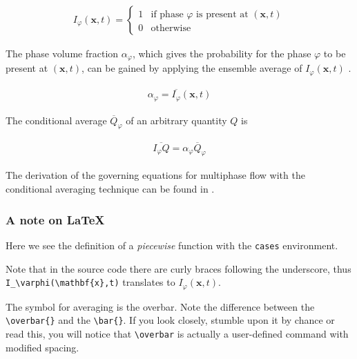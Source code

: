 \begin{gather}
	I_\varphi(\mathbf{x},t) = \begin{cases}
		1	& \text{if phase $\varphi$ is present at } (\mathbf{x},t) \\
		0	& \text{otherwise}
	\end{cases}
\end{gather}

The phase volume fraction $\alpha_\varphi$, which gives the probability for the phase $\varphi$ 
to be present at $(\mathbf{x},t)$, can be gained by applying the ensemble average of 
$I_\varphi(\mathbf{x},t)$ \cite{openCFD2005}.

\begin{gather}
	\alpha_\varphi = \overbar{I_\varphi}(\mathbf{x},t)
\end{gather}

The conditional average $\overbar{Q}_\varphi$ of an arbitrary quantity $Q$ is 

\begin{gather}
	\overbar{I_\varphi Q} = \alpha_\varphi \overbar{Q}_\varphi
\end{gather}

The derivation of the governing equations for multiphase flow with the conditional averaging 
technique can be found in \cite{marschallPhD,openCFD2005}.


%
%
%
%



\subsubsection*{A note on \LaTeX{}}

Here we see the definition of a \emph{piecewise} function with the \verb+cases+ environment.


Note that in the source code there are curly braces following the underscore, thus 
\verb+I_\varphi(\mathbf{x},t)+ translates to $I_\varphi(\mathbf{x},t)$.


The symbol for averaging is the overbar. Note the difference between the \verb+\overbar{}+ 
and the \verb+\bar{}+. If you look closely, stumble upon it by chance or read this, you will 
notice that \verb+\overbar+ is actually a user-defined command with modified spacing.

